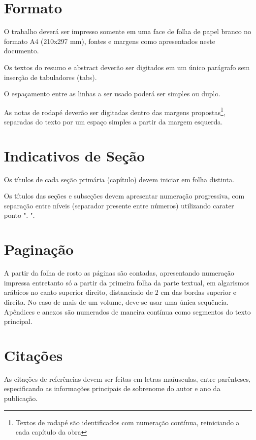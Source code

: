 \documentclass[repeatfields,xlists,xpacks,oneside,yearsonly]{ufrgscca}
\begin{document}
\begin{appendix}
\section{Formato}

O trabalho deverá ser impresso somente em uma face de folha de papel
branco no formato A4 (210x297 mm), fontes e margens como apresentados neste documento.

Os textos do resumo e abstract deverão ser digitados em um único parágrafo
sem inserção de tabuladores (tabs).

O espaçamento entre as linhas a ser usado poderá ser simples ou duplo.

As notas de rodapé deverão ser digitadas dentro das margens
propostas\footnote{Textos de rodapé são identificados com numeração
contínua, reiniciando a cada capítulo da obra}, separadas do texto por um
espaço simples a partir da margem esquerda.

\section{Indicativos de Seção}

Os títulos de cada seção primária (capítulo) devem iniciar em folha
distinta.

Os títulos das seções e subseções devem apresentar numeração progressiva,
com separação entre níveis (separador presente entre números) utilizando
carater ponto ". ".

\section{Paginação}

A partir da folha de rosto as páginas são contadas, apresentando numeração
impressa entretanto só a partir da primeira folha da parte textual, em
algarismos arábicos no canto superior direito, distanciado de 2 cm das
bordas superior e direita. No caso de mais de um volume, deve-se usar uma
única sequência. Apêndices e anexos são numerados de maneira contínua como
segmentos do texto principal.

\section{Citações}

As citações de referências devem ser feitas em letras maíusculas, entre
parênteses, especificando as informações principais de sobrenome do autor e
ano da publicação.\\


\end{appendix}
\end{document}
